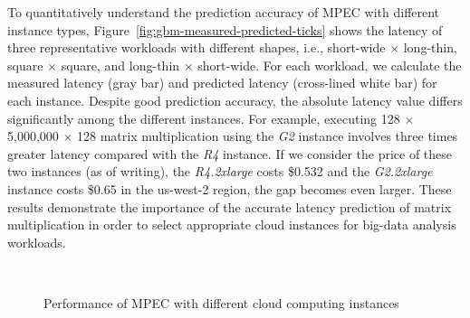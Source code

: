 \documentclass[10pt, conference, compsocconf]{IEEEtran}
\begin{document}
To quantitatively understand the prediction accuracy of MPEC with different instance types, Figure~\ref{fig:gbm-measured-predicted-ticks} shows the latency of three representative workloads with different shapes, i.e., short-wide $\times$ long-thin, square $\times$ square, and long-thin $\times$ short-wide. For each workload, we calculate the measured latency (gray bar) and predicted latency (cross-lined white bar) for each instance. Despite good prediction accuracy, the absolute latency value differs significantly among the different instances. For example, executing 128 $\times$ 5,000,000 $\times$ 128 matrix multiplication using the \textit{G2} instance involves three times greater latency compared with the \textit{R4} instance. If we consider the price of these two instances (as of writing), the \textit{R4.2xlarge} costs \$0.532 and the \textit{G2.2xlarge} instance costs \$0.65 in the us-west-2 region, the gap becomes even larger. These results demonstrate the importance of the accurate latency prediction of matrix multiplication in order to select appropriate cloud instances for big-data analysis workloads.

\begin{figure}[t]
	\centering
	\\
	 \hfil
	\caption{\label{fig:gbm-comparison}Performance of MPEC with different cloud computing instances}
\end{figure}
\end{document}
